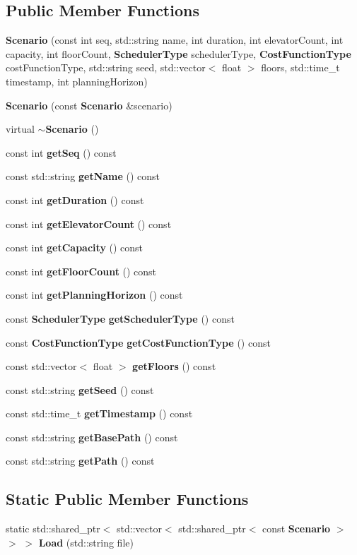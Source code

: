 \subsection*{Public Member Functions}
\begin{DoxyCompactItemize}
\item 
{\bf Scenario} (const int seq, std\+::string name, int duration, int elevator\+Count, int capacity, int floor\+Count, {\bf Scheduler\+Type} scheduler\+Type, {\bf Cost\+Function\+Type} cost\+Function\+Type, std\+::string seed, std\+::vector$<$ float $>$ floors, std\+::time\+\_\+t timestamp, int planning\+Horizon)
\item 
{\bf Scenario} (const {\bf Scenario} \&scenario)
\item 
virtual {\bf $\sim$\+Scenario} ()
\item 
const int {\bf get\+Seq} () const 
\item 
const std\+::string {\bf get\+Name} () const 
\item 
const int {\bf get\+Duration} () const 
\item 
const int {\bf get\+Elevator\+Count} () const 
\item 
const int {\bf get\+Capacity} () const 
\item 
const int {\bf get\+Floor\+Count} () const 
\item 
const int {\bf get\+Planning\+Horizon} () const 
\item 
const {\bf Scheduler\+Type} {\bf get\+Scheduler\+Type} () const 
\item 
const {\bf Cost\+Function\+Type} {\bf get\+Cost\+Function\+Type} () const 
\item 
const std\+::vector$<$ float $>$ {\bf get\+Floors} () const 
\item 
const std\+::string {\bf get\+Seed} () const 
\item 
const std\+::time\+\_\+t {\bf get\+Timestamp} () const 
\item 
const std\+::string {\bf get\+Base\+Path} () const 
\item 
const std\+::string {\bf get\+Path} () const 
\end{DoxyCompactItemize}
\subsection*{Static Public Member Functions}
\begin{DoxyCompactItemize}
\item 
static std\+::shared\+\_\+ptr$<$ std\+::vector$<$ std\+::shared\+\_\+ptr$<$ const {\bf Scenario} $>$ $>$ $>$ {\bf Load} (std\+::string file)
\end{DoxyCompactItemize}


